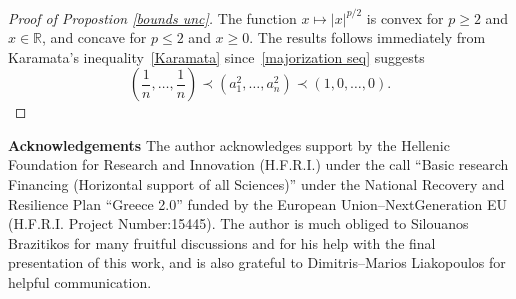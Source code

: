 \documentclass[10pt]{amsart}
\newcommand{\1}{\textbf{1}}
\numberwithin{equation}{section} %
\theoremstyle{remark}
\theoremstyle{definition}
\begin{document}
\begin{proof}[Proof of Propostion \ref{bounds unc}]
The function $x \mapsto |x|^{p/2}$ is convex for $p \ge 2$ and $x \in \mathbb{R}$, and concave for $p \le 2$ and $x \ge 0$. The results follows immediately from Karamata's inequality~\ref{Karamata} since~\eqref{majorization seq} suggests $$\left(\frac{1}{n},\ldots,\frac{1}{n} \right)\prec (a_1^2,\ldots,a_n^2)\prec (1,0,\ldots,0).$$
\end{proof}


\noindent

%
{\bf Acknowledgements} The  author acknowledges support by the Hellenic Foundation for Research and Innovation (H.F.R.I.) under the call “Basic research Financing (Horizontal support of all Sciences)” under the National Recovery and Resilience Plan “Greece 2.0” funded by the European Union–NextGeneration EU (H.F.R.I. Project Number:15445). The author is much obliged to Silouanos Brazitikos for many fruitful discussions and for his help with the final presentation of this work, and is also grateful to Dimitris--Marios Liakopoulos for helpful communication.





\end{document}
